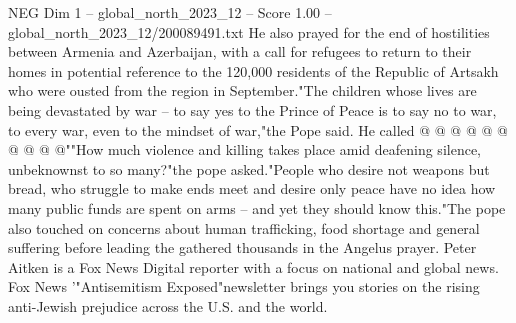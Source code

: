 \begin{textsample}{NEG Dim 1 – global\_north\_2023\_12 – Score 1.00 – global\_north\_2023\_12/200089491.txt}
He also prayed for the end of hostilities between Armenia and Azerbaijan, with a call for refugees to return to their homes in potential reference to the 120,000 residents of the Republic of Artsakh who were ousted from the region in September."The children whose lives are being devastated by war -- to say yes to the Prince of Peace is to say no to war, to every war, even to the mindset of war,"the Pope said.
He called @ @ @ @ @ @ @ @ @ @""How much violence and killing takes place amid deafening silence, unbeknownst to so many?"the pope asked."People who desire not weapons but bread, who struggle to make ends meet and desire only peace have no idea how many public funds are spent on arms -- and yet they should know this."The pope also touched on concerns about human trafficking, food shortage and general suffering before leading the gathered thousands in the Angelus prayer.
Peter Aitken is a Fox News Digital reporter with a focus on national and global news.
Fox News '"Antisemitism Exposed"newsletter brings you stories on the rising anti-Jewish prejudice across the U.S. and the world.

\end{textsample}
